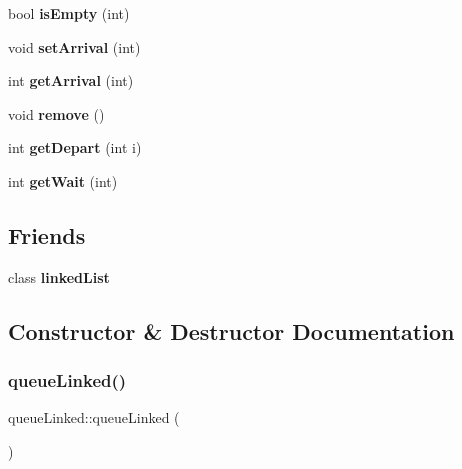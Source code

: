 \begin{DoxyCompactItemize}
\mbox{\label{classqueue_linked_aa7213f39967c771e23beba31a07b17af}} 
bool {\bfseries is\+Empty} (int)
\item 
\mbox{\label{classqueue_linked_a1157080a90f16c2f34e7ad77692c4856}} 
void {\bfseries set\+Arrival} (int)
\item 
\mbox{\label{classqueue_linked_aeb67c50e755c881e01034f7cf420b25d}} 
int {\bfseries get\+Arrival} (int)
\item 
\mbox{\label{classqueue_linked_a5cc8a954aa7e02d4cd482a165bf630a9}} 
void {\bfseries remove} ()
\item 
\mbox{\label{classqueue_linked_a9f34717aa527fcfdd7835393cb061a70}} 
int {\bfseries get\+Depart} (int i)
\item 
\mbox{\label{classqueue_linked_a78d72dd1c926d6b71e463b1e76f4b3d9}} 
int {\bfseries get\+Wait} (int)
\end{DoxyCompactItemize}
\subsection*{Friends}
\begin{DoxyCompactItemize}
\item 
\mbox{\label{classqueue_linked_a2b0374b228b28be7b4964a6a7bdf7bba}} 
class {\bfseries linked\+List}
\end{DoxyCompactItemize}


\subsection{Constructor \& Destructor Documentation}
\mbox{\label{classqueue_linked_a3c940956f0ad6b1f10d213860ac6b19d}} 
\subsubsection{\texorpdfstring{queue\+Linked()}{queueLinked()}}
{\footnotesize\ttfamily queue\+Linked\+::queue\+Linked (\begin{DoxyParamCaption}{ }\end{DoxyParamCaption})}



